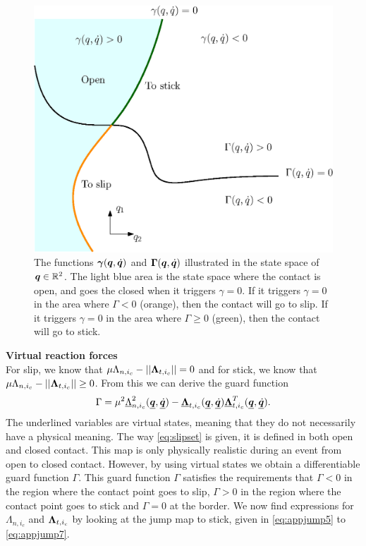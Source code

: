 \documentclass[../DC2017114Bouma.tex]{subfiles}
\begin{document}
\begin{figure}[H]
	\centering
	\includegraphics[width=.7\textwidth]{guardopcl.eps}\caption{The functions $\boldsymbol{\gamma}({\boldsymbol{q}},\dot{{\boldsymbol{q}}})$ and $\boldsymbol{\Gamma}({\boldsymbol{q}},\dot{{\boldsymbol{q}}})$ illustrated in the state space of ${\boldsymbol{q}}\in\mathbb{R}^{2}$. The light blue area is the state space where the contact is open, and goes the closed when it triggers $\gamma = 0$. If it triggers $\gamma = 0$ in the area where $\Gamma<0$ (orange), then the contact will go to slip. If it triggers $\gamma=0$ in the area where $\Gamma\geq 0$ (green), then the contact will go to stick.}\label{fig:guardopcl}
\end{figure}
\textbf{Virtual reaction forces}\\
For slip, we know that $\mu\Lambda_{n,i_c} - ||\boldsymbol{\Lambda}_{t,i_c}|| = 0$ and for stick, we know that  $\mu\Lambda_{n,i_c} - ||\boldsymbol{\Lambda}_{t,i_c}|| \geq 0$. From this we can derive the guard function
\begin{align}
\Gamma = \mu^2 \underline{\Lambda}_{n,i_c}^2(\underline{{\boldsymbol{q}}},\underline{\dot{{\boldsymbol{q}}}}) - \underline{\boldsymbol{\Lambda}}_{t,i_c}(\underline{{\boldsymbol{q}}},\underline{\dot{{\boldsymbol{q}}}})\underline{\boldsymbol{\Lambda}}_{t,i_c}^T(\underline{{\boldsymbol{q}}},\underline{\dot{{\boldsymbol{q}}}}). \label{eq:slipset}
\end{align}
The underlined variables are virtual states, meaning that they do not necessarily have a physical meaning. The way \eqref{eq:slipset} is given, it is defined in both open and closed contact. This map is only physically realistic during an event from open to closed contact. However, by using virtual states we obtain a differentiable guard function $\Gamma$. This guard function $\Gamma$ satisfies the requirements that $\Gamma<0$ in the region where the contact point goes to slip, $\Gamma > 0$ in the region where the contact point goes to stick and $\Gamma = 0$ at the border. We now find expressions for $\Lambda_{n,i_c}$ and $\boldsymbol{\Lambda}_{t,i_c}$ by looking at the jump map to stick, given in \eqref{eq:appjump5} to \eqref{eq:appjump7}.
\end{document}
